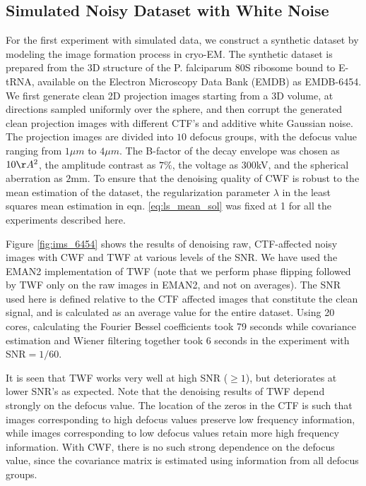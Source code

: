 \documentclass[review]{elsarticle}
\begin{document}
\subsection{Simulated Noisy Dataset with White Noise}
\label{sec:whitenoise}
For the first experiment with simulated data, we construct a synthetic dataset 
by modeling the image formation process in 
cryo-EM. The synthetic dataset is prepared from the 3D structure of the P. 
falciparum 80S ribosome bound to E-tRNA, available on the Electron
Microscopy Data Bank (EMDB) as EMDB-6454. We first generate clean 2D projection 
images starting from a 3D volume, at directions sampled uniformly
over the sphere, and then corrupt the generated clean projection images with 
different CTF's and additive white Gaussian 
noise. The projection images are divided into $10$ defocus groups, with the 
defocus value
ranging from $1\mu m$ to $4\mu m$. The B-factor of the decay envelope was 
chosen 
as $10\AA^2$, the amplitude contrast as $7\%$,
the voltage as $300$kV, and the spherical aberration as $2$mm. To ensure that 
the denoising quality of CWF is robust to the mean estimation of the dataset, 
the regularization parameter $\lambda$ in the least squares mean estimation in eqn. \ref{eq:ls_mean_sol} was 
fixed at 1 for all the experiments
described here.

Figure \ref{fig:ims_6454} shows the results of denoising 
raw, CTF-affected noisy images with CWF and
TWF at various levels of the SNR. We have used the EMAN2 \cite{eman2}
implementation of TWF (note that we perform phase flipping followed 
by TWF only on the raw images in EMAN2, and not on averages). The SNR used here is defined relative to the 
CTF affected images that constitute the clean signal, and is calculated
as an average value for the entire dataset. Using 20 cores, calculating the Fourier Bessel
coefficients took 79 seconds while covariance estimation and Wiener filtering together
took 6 seconds in the experiment with SNR$=1/60$. 

It is seen that TWF works very well at high SNR ($\geq1$), but deteriorates 
at lower SNR's as expected. Note that the denoising results of TWF depend 
strongly on the defocus value. 
The location of the zeros in the CTF is such that images 
corresponding to high defocus values preserve low frequency information, while 
images corresponding to low defocus values
retain more high frequency information. With CWF, there is no such strong 
dependence on the defocus value, since the covariance matrix is estimated
using information from all defocus groups. 
\end{document}
